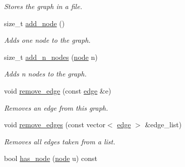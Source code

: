 \begin{DoxyCompactItemize}
\begin{DoxyCompactList}\small\item\em Stores the graph in a file. \end{DoxyCompactList}\item 
size\+\_\+t \hyperlink{classlgraph_1_1utils_1_1xxgraph_af41baf2c098e872731ad646aeec1b382}{add\+\_\+node} ()
\begin{DoxyCompactList}\small\item\em Adds one node to the graph. \end{DoxyCompactList}\item 
size\+\_\+t \hyperlink{classlgraph_1_1utils_1_1xxgraph_af4f3782c1a55f73c6f34f2f2c26fb404}{add\+\_\+n\+\_\+nodes} (\hyperlink{namespacelgraph_1_1utils_a7bd66ede3805ef121bc2835bd48de0cf}{node} n)
\begin{DoxyCompactList}\small\item\em Adds {\itshape n} nodes to the graph. \end{DoxyCompactList}\item 
void \hyperlink{classlgraph_1_1utils_1_1xxgraph_af826c05492f237d7727f88ebab033001}{remove\+\_\+edge} (const \hyperlink{namespacelgraph_1_1utils_a6510284ce1b1ae5dc97ce5d2de426e10}{edge} \&e)
\begin{DoxyCompactList}\small\item\em Removes an edge from this graph. \end{DoxyCompactList}\item 
void \hyperlink{classlgraph_1_1utils_1_1xxgraph_a747da8a567d232081199499f23821926}{remove\+\_\+edges} (const vector$<$ \hyperlink{namespacelgraph_1_1utils_a6510284ce1b1ae5dc97ce5d2de426e10}{edge} $>$ \&edge\+\_\+list)
\begin{DoxyCompactList}\small\item\em Removes all edges taken from a list. \end{DoxyCompactList}\item 
bool \hyperlink{classlgraph_1_1utils_1_1xxgraph_a026ab064c2be26790cc1f547be2157c9}{has\+\_\+node} (\hyperlink{namespacelgraph_1_1utils_a7bd66ede3805ef121bc2835bd48de0cf}{node} u) const \hypertarget{classlgraph_1_1utils_1_1xxgraph_a026ab064c2be26790cc1f547be2157c9}{}\label{classlgraph_1_1utils_1_1xxgraph_a026ab064c2be26790cc1f547be2157c9}


\end{DoxyCompactItemize}
